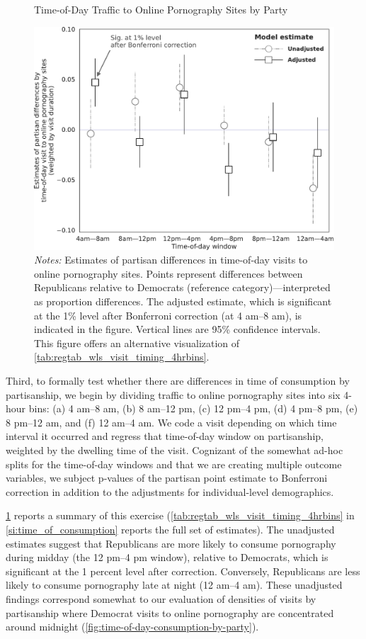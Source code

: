 \documentclass[12pt, letterpaper]{article}
\begin{document}
\begin{figure}[ht]
\centering
\caption{Time-of-Day Traffic to Online Pornography Sites by Party}
    \includegraphics[width=.85\linewidth]{figs/time-of-day-wls-estimates.pdf}
\caption*{\footnotesize \emph{Notes:} 
        Estimates of partisan differences in time-of-day visits to online pornography sites.
        Points represent differences between Republicans relative to Democrats (reference category)---interpreted as proportion differences.
        The adjusted estimate, which is significant at the 1\% level after Bonferroni correction (at 4 am--8 am), is indicated in the figure.
        Vertical lines are 95\% confidence intervals.
        This figure offers an alternative visualization of \cref{tab:regtab_wls_visit_timing_4hrbins}.
	}
    \label{fig:time-of-day-wls-estimates}
\end{figure}

Third, to formally test whether there are differences in time of consumption by partisanship, we begin by dividing traffic to online pornography sites into six 4-hour bins: (a) 4 am--8 am, (b) 8 am--12 pm, (c) 12 pm--4 pm, (d) 4 pm--8 pm, (e) 8 pm--12 am, and (f) 12 am--4 am. We code a visit depending on which time interval it occurred and regress that time-of-day window on partisanship, weighted by the dwelling time of the visit. Cognizant of the somewhat ad-hoc splits for the time-of-day windows and that we are creating multiple outcome variables, we subject p-values of the partisan point estimate to Bonferroni correction in addition to the adjustments for individual-level demographics.

\cref{fig:time-of-day-wls-estimates} reports a summary of this exercise (\cref{tab:regtab_wls_visit_timing_4hrbins} in \cref{si:time_of_consumption} reports the full set of estimates). The unadjusted estimates suggest that Republicans are more likely to consume pornography during midday (the 12 pm--4 pm window), relative to Democrats, which is significant at the 1 percent level after correction. Conversely, Republicans are less likely to consume pornography late at night (12 am--4 am). These unadjusted findings correspond somewhat to our evaluation of densities of visits by partisanship where Democrat visits to online pornography are concentrated around midnight (\cref{fig:time-of-day-consumption-by-party}).
\end{document}
